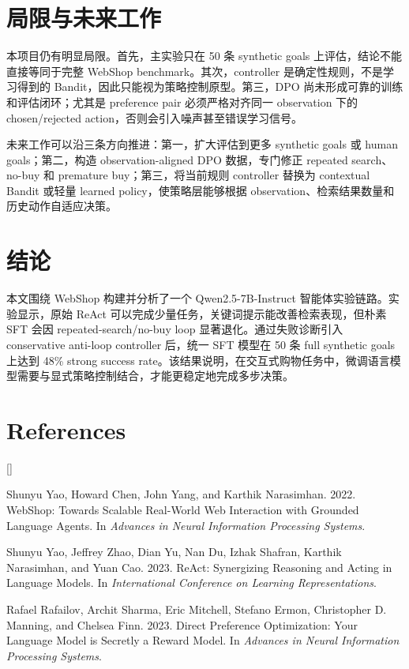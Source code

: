 \documentclass[11pt]{article}
\begin{document}
\FloatBarrier
\section{局限与未来工作}

本项目仍有明显局限。首先，主实验只在 50 条 synthetic goals 上评估，结论不能直接等同于完整 WebShop benchmark。其次，controller 是确定性规则，不是学习得到的 Bandit，因此只能视为策略控制原型。第三，DPO 尚未形成可靠的训练和评估闭环；尤其是 preference pair 必须严格对齐同一 observation 下的 chosen/rejected action，否则会引入噪声甚至错误学习信号。

未来工作可以沿三条方向推进：第一，扩大评估到更多 synthetic goals 或 human goals；第二，构造 observation-aligned DPO 数据，专门修正 repeated search、no-buy 和 premature buy；第三，将当前规则 controller 替换为 contextual Bandit 或轻量 learned policy，使策略层能够根据 observation、检索结果数量和历史动作自适应决策。

\section{结论}

本文围绕 WebShop 构建并分析了一个 Qwen2.5-7B-Instruct 智能体实验链路。实验显示，原始 ReAct 可以完成少量任务，关键词提示能改善检索表现，但朴素 SFT 会因 repeated-search/no-buy loop 显著退化。通过失败诊断引入 conservative anti-loop controller 后，统一 SFT 模型在 50 条 full synthetic goals 上达到 48\% strong success rate。该结果说明，在交互式购物任务中，微调语言模型需要与显式策略控制结合，才能更稳定地完成多步决策。

\balance
\section*{References}
\begin{list}{[]}{\setlength{\leftmargin}{1.8em}\setlength{\labelsep}{0.45em}\setlength{\itemsep}{0.35em}\setlength{\parsep}{0pt}\setlength{\topsep}{0.2em}}

\item Shunyu Yao, Howard Chen, John Yang, and Karthik Narasimhan. 2022. WebShop: Towards Scalable Real-World Web Interaction with Grounded Language Agents. In \textit{Advances in Neural Information Processing Systems}.

\item Shunyu Yao, Jeffrey Zhao, Dian Yu, Nan Du, Izhak Shafran, Karthik Narasimhan, and Yuan Cao. 2023. ReAct: Synergizing Reasoning and Acting in Language Models. In \textit{International Conference on Learning Representations}.

\item Rafael Rafailov, Archit Sharma, Eric Mitchell, Stefano Ermon, Christopher D. Manning, and Chelsea Finn. 2023. Direct Preference Optimization: Your Language Model is Secretly a Reward Model. In \textit{Advances in Neural Information Processing Systems}.

\end{list}
\end{document}
